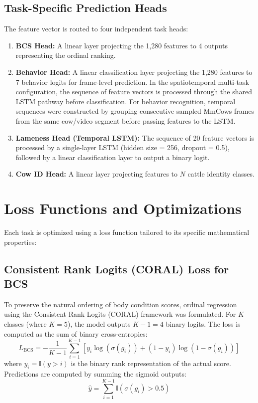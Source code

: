 \subsection{Task-Specific Prediction Heads}
The feature vector is routed to four independent task heads:
\begin{enumerate}
    \item \textbf{BCS Head:} A linear layer projecting the 1,280 features to 4 outputs representing the ordinal ranking.
    \item \textbf{Behavior Head:} A linear classification layer projecting the 1,280 features to 7 behavior logits for frame-level prediction. In the spatiotemporal multi-task configuration, the sequence of feature vectors is processed through the shared LSTM pathway before classification. For behavior recognition, temporal sequences were constructed by grouping consecutive sampled MmCows frames from the same cow/video segment before passing features to the LSTM.
    \item \textbf{Lameness Head (Temporal LSTM):} The sequence of 20 feature vectors is processed by a single-layer LSTM (hidden size = 256, dropout = 0.5), followed by a linear classification layer to output a binary logit.
    \item \textbf{Cow ID Head:} A linear layer projecting features to $N$ cattle identity classes.
\end{enumerate}

\section{Loss Functions and Optimizations}
Each task is optimized using a loss function tailored to its specific mathematical properties:

\subsection{Consistent Rank Logits (CORAL) Loss for BCS}
To preserve the natural ordering of body condition scores, ordinal regression using the Consistent Rank Logits (CORAL) framework \cite{coral2020} was formulated. For $K$ classes (where $K=5$), the model outputs $K-1=4$ binary logits. The loss is computed as the sum of binary cross-entropies:
\begin{equation}
    L_{\text{BCS}} = -\frac{1}{K-1} \sum_{i=1}^{K-1} \left[ y_i \log(\sigma(g_i)) + (1 - y_i) \log(1 - \sigma(g_i)) \right]
\end{equation}
where $y_i = \mathbb{I}(y > i)$ is the binary rank representation of the actual score. Predictions are computed by summing the sigmoid outputs:
\begin{equation}
    \hat{y} = \sum_{i=1}^{K-1} \mathbb{I}(\sigma(g_i) > 0.5)
\end{equation}

